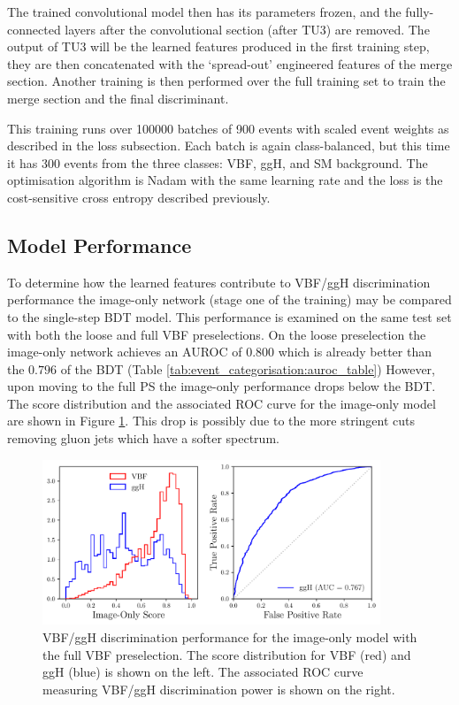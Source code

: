 The trained convolutional model then has its parameters frozen, and the fully-connected layers after the convolutional section (after TU3) are removed. 
The output of TU3 will be the learned features produced in the first training step, they are then concatenated with the `spread-out' engineered features of the merge section.
Another training is then performed over the full training set to train the merge section and the final discriminant. 

This training runs over 100000 batches of 900 events with scaled event weights as described in the loss subsection. 
Each batch is again class-balanced, but this time it has 300 events from the three classes: VBF, ggH, and SM background. 
The optimisation algorithm is Nadam with the same learning rate and the loss is the cost-sensitive cross entropy described previously. 














\subsection{Model Performance}
To determine how the learned features contribute to VBF/ggH discrimination performance the image-only network (stage one of the training) may be compared to the single-step BDT model.
This performance is examined on the same test set with both the loose and full VBF preselections.
On the loose preselection the image-only network achieves an AUROC of $0.800$ which is already better than the $0.796$ of the BDT (Table \ref{tab:event_categorisation:auroc_table}) 
However, upon moving to the full PS the image-only performance drops below the BDT. The score distribution and the associated ROC curve for the image-only model are shown in Figure \ref{fig:event_categorisation:image_only_DCNN}. This drop is possibly due to the more stringent \pt cuts removing gluon jets which have a softer \pt spectrum.
\begin{figure}[h!]
    \centering
    \includegraphics[width=0.9\textwidth]{figures/event_selection/imgonly_DCNN_PS.pdf}
    \caption{VBF/ggH discrimination performance for the image-only model with the full VBF preselection. The score distribution for VBF (red) and ggH (blue) is shown on the left. The associated ROC curve measuring VBF/ggH discrimination power is shown on the right.}
    \label{fig:event_categorisation:image_only_DCNN}
\end{figure}

